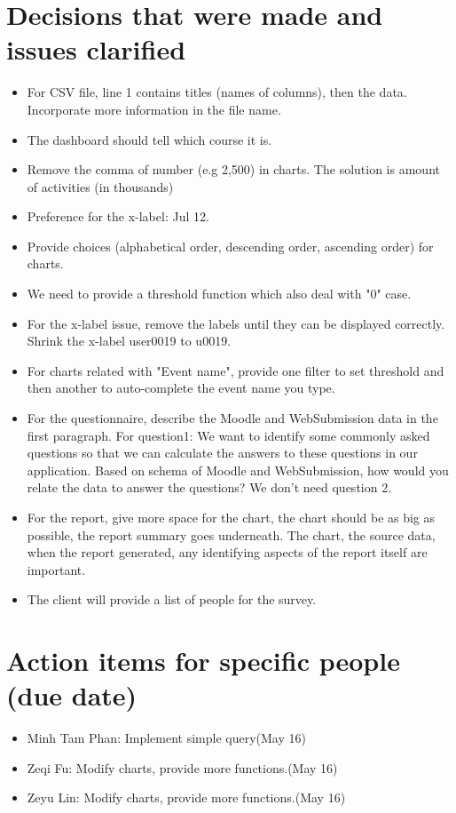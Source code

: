 \documentclass[11pt, a4paper]{article}
\begin{document}
\section{Decisions that were made and issues clarified}
\begin{itemize}
	\item For CSV file, line 1 contains titles (names of columns), then the data. Incorporate more information in the file name.
	\item The dashboard should tell which course it is.
	\item Remove the comma of number (e.g 2,500) in charts. The solution is amount of activities (in thousands)
	\item Preference for the x-label: Jul 12.
	\item Provide choices (alphabetical order, descending order, ascending order) for charts.
	\item We need to provide a threshold function which also deal with "0" case.
	\item For the x-label issue, remove the labels until they can be displayed correctly. Shrink the x-label user0019 to u0019.
	\item For charts related with "Event name", provide one filter to set threshold and then another to auto-complete the event name you type.
	\item For the questionnaire, describe the Moodle and WebSubmission data in the first paragraph. For question1: We want to identify some commonly asked questions so that we can calculate the answers to these questions in our application. Based on schema of Moodle and WebSubmission, how would 
you relate the data to answer the questions? We don't need question 2.
	\item For the report, give more space for the chart, the chart
should be as big as possible, the report summary goes underneath.
The chart, the source data, when the report generated, any identifying aspects of the report itself are important.
	\item The client will provide a list of people for the survey.

\end{itemize}

\section{Action items for specific people (due date)}
\begin{itemize}
	\item Minh Tam Phan: Implement simple query(May 16)
	\item Zeqi Fu: Modify charts, provide more functions.(May 16)
	\item Zeyu Lin: Modify charts, provide more functions.(May 16)

\end{itemize}
\end{document}
